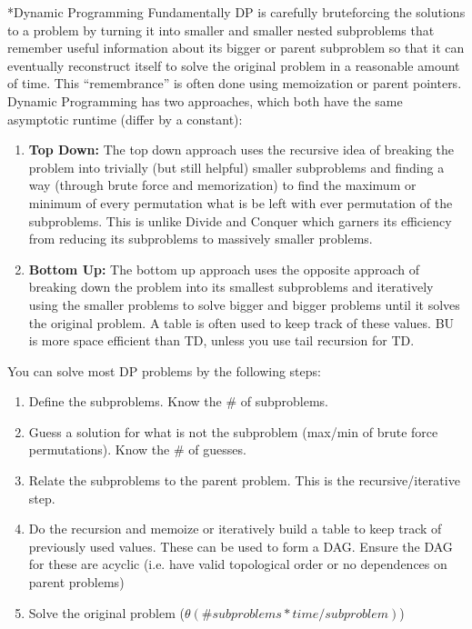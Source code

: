 \documentclass[3pt,landscape]{article}
\makeatletter
\renewcommand{\section}{\@startsection{section}{1}{0mm}{-1ex plus -.5ex minus -.2ex}{0.5ex plus .2ex}{\normalfont\large\bfseries}}
\makeatother
\begin{document}
\begin{multicols}{3}
\section*{Dynamic Programming}
Fundamentally DP is carefully bruteforcing the solutions to a problem by turning it into smaller and smaller nested subproblems that remember useful information about its bigger or parent subproblem so that it can eventually reconstruct itself to solve the original problem in a reasonable amount of time. This ``remembrance'' is often done using memoization or parent pointers.\\
Dynamic Programming has two approaches, which both have the same asymptotic runtime (differ by a constant):
\begin{enumerate}
\item \textbf{Top Down:}
The top down approach uses the recursive idea of breaking the problem into trivially (but still helpful) smaller subproblems and finding a way (through brute force and memorization) to find the maximum or minimum of every permutation what is be left with ever permutation of the subproblems. This is unlike Divide and Conquer which garners its efficiency from reducing its subproblems to massively smaller problems. 
\item \textbf{Bottom Up:}
The bottom up approach uses the opposite approach of breaking down the problem into its smallest subproblems and iteratively using the smaller problems to solve bigger and bigger problems until it solves the original problem. A table is often used to keep track of these values. BU is more space efficient than TD, unless you use tail recursion for TD.
\end{enumerate} 
You can solve most DP problems by the following steps:
\begin{enumerate}
\item Define the subproblems. Know the \# of subproblems. 
\item Guess a solution for what is not the subproblem (max/min of brute force permutations). Know the \# of guesses.
\item Relate the subproblems to the parent problem. This is the recursive/iterative step. 
\item Do the recursion and memoize or iteratively build a table to keep track of previously used values. These can be used to form a DAG. Ensure the DAG for these are acyclic (i.e. have valid topological order or no dependences on parent problems)
\item Solve the original problem
($\theta(\# subproblems * time/subproblem)$)

\end{enumerate}
\end{multicols}
\end{document}
